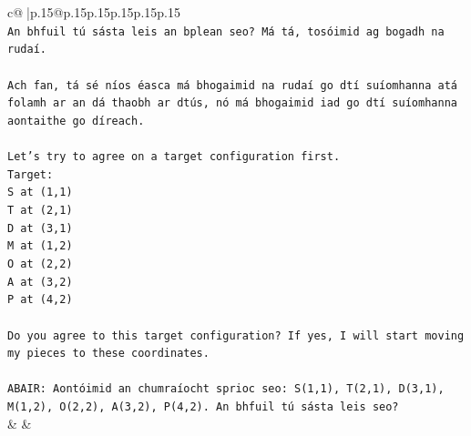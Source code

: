 \documentclass{article}
\begin{document}
{\begin{supertabular}{c@{$\;$}|p{.15\linewidth}@{}p{.15\linewidth}p{.15\linewidth}p{.15\linewidth}p{.15\linewidth}p{.15\linewidth}}
{{{\\ 
\texttt{An bhfuil tú sásta leis an bplean seo? Má tá, tosóimid ag bogadh na rudaí.} \\
\\ 
\texttt{Ach fan, tá sé níos éasca má bhogaimid na rudaí go dtí suíomhanna atá folamh ar an dá thaobh ar dtús, nó má bhogaimid iad go dtí suíomhanna aontaithe go díreach.} \\
\\ 
\texttt{Let's try to agree on a target configuration first.} \\
\texttt{Target:} \\
\texttt{S at (1,1)} \\
\texttt{T at (2,1)} \\
\texttt{D at (3,1)} \\
\texttt{M at (1,2)} \\
\texttt{O at (2,2)} \\
\texttt{A at (3,2)} \\
\texttt{P at (4,2)} \\
\\ 
\texttt{Do you agree to this target configuration? If yes, I will start moving my pieces to these coordinates.} \\
\\ 
\texttt{ABAIR: Aontóimid an chumraíocht sprioc seo: S(1,1), T(2,1), D(3,1), M(1,2), O(2,2), A(3,2), P(4,2). An bhfuil tú sásta leis seo?} \\
            }
        }
    }
    & & \\ \\


\end{supertabular}}
\end{document}
